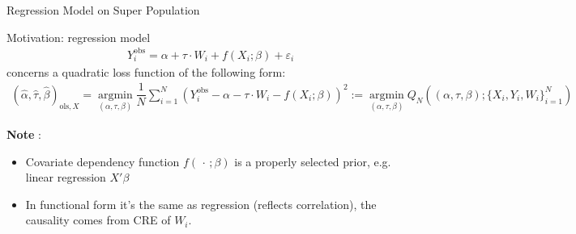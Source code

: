 \begin{point}
    Regression Model on Super Population
\end{point}

Motivation: regression model
\begin{align}
    Y_i^\mathrm{obs}=\alpha +\tau\cdot W_i + f(X_i;\beta )+\varepsilon _i  
\end{align}
concerns a quadratic loss function of the following form:
\begin{align}
    (\hat{\alpha },\hat{\tau},\hat{\beta })_{\mathrm{ols},X}=\mathop{\arg\min}\limits_{(\alpha ,\tau,\beta )} \dfrac{1}{N}\sum_{i=1}^N\left( Y^\mathrm{obs}_i-\alpha-\tau\cdot W_i - f(X_i;\beta )\right)^2 := \mathop{\arg\min}\limits_{(\alpha ,\tau,\beta )}Q_N\left((\alpha ,\tau,\beta );\{X_i,Y_i,W_i\}_{i=1}^N\right)
\end{align}

\textbf{Note} :
\begin{itemize}[topsep=2pt,itemsep=0pt]
    \item Covariate dependency function $ f(\, \cdot \, ;\beta ) $ is a properly selected prior, e.g. linear regression $ X'\beta  $
    \item In functional form it's the same as regression (reflects correlation), the causality comes from CRE of $ W_i $.
\end{itemize}

